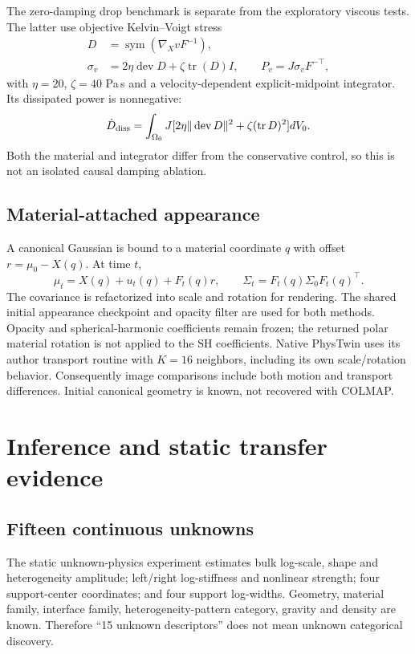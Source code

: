 \documentclass[10pt,twocolumn,letterpaper]{article}
\newcommand{\tr}{\operatorname{tr}}
\newcommand{\dev}{\operatorname{dev}}
\begin{document}
The zero-damping drop benchmark is separate from the exploratory viscous tests. The latter use objective Kelvin--Voigt stress
\begin{align}
 D&=\operatorname{sym}(\nabla_XvF^{-1}),\\
 \sigma_v&=2\eta\dev D+\zeta\tr(D)I,\qquad P_v=J\sigma_vF^{-\top},
\end{align}
with $\eta=20$, $\zeta=40$ Pa\,s and a velocity-dependent explicit-midpoint integrator. Its dissipated power is nonnegative:
\begin{equation}
 \dot D_{\rm diss}=\int_{\Omega_0}J[2\eta\|\dev D\|^2+\zeta(\tr D)^2]dV_0.
\end{equation}
Both the material and integrator differ from the conservative control, so this is not an isolated causal damping ablation.

\subsection{Material-attached appearance}
A canonical Gaussian is bound to a material coordinate $q$ with offset $r=\mu_0-X(q)$. At time $t$,
\begin{equation}
 \mu_t=X(q)+u_t(q)+F_t(q)r,\qquad \Sigma_t=F_t(q)\Sigma_0F_t(q)^\top.
\end{equation}
The covariance is refactorized into scale and rotation for rendering. The shared initial appearance checkpoint and opacity filter are used for both methods. Opacity and spherical-harmonic coefficients remain frozen; the returned polar material rotation is not applied to the SH coefficients. Native PhysTwin uses its author transport routine with $K=16$ neighbors, including its own scale/rotation behavior. Consequently image comparisons include both motion and transport differences. Initial canonical geometry is known, not recovered with COLMAP.

\section{Inference and static transfer evidence}
\subsection{Fifteen continuous unknowns}
The static unknown-physics experiment estimates bulk log-scale, shape and heterogeneity amplitude; left/right log-stiffness and nonlinear strength; four support-center coordinates; and four support log-widths. Geometry, material family, interface family, heterogeneity-pattern category, gravity and density are known. Therefore ``15 unknown descriptors'' does not mean unknown categorical discovery.
\end{document}
